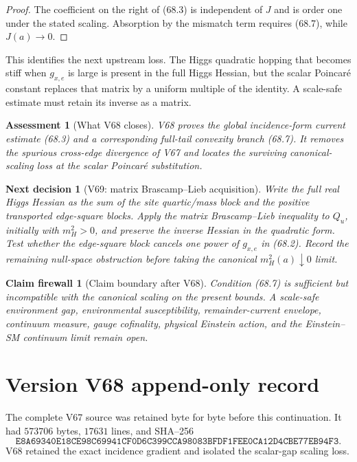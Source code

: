 \documentclass[11pt]{article}
\newtheorem{firewall}[theorem]{Claim firewall}
\newtheorem{decision}[theorem]{Next decision}
\newtheorem{assessment}[theorem]{Assessment}
\theoremstyle{remark}
\begin{document}
\begin{proof}
The coefficient on the right of (68.3) is independent of \(J\) and is
order one under the stated scaling.  Absorption by the mismatch term
requires (68.7), while \(J(a)\to0\).
\end{proof}

This identifies the next upstream loss.  The Higgs quadratic hopping
that becomes stiff when \(g_{x,e}\) is large is present in the full
Higgs Hessian, but the scalar Poincar\'e constant replaces that matrix
by a uniform multiple of the identity.  A scale-safe estimate must
retain its inverse as a matrix.

\begin{assessment}[What V68 closes]
\label{ass:v17v68-status}
V68 proves the global incidence-form current estimate (68.3) and a
corresponding full-tail convexity branch (68.7).  It removes the
spurious cross-edge divergence of V67 and locates the surviving
canonical-scaling loss at the scalar Poincar\'e substitution.
\end{assessment}

\begin{decision}[V69: matrix Brascamp--Lieb acquisition]
\label{dec:v17v68-next}
Write the full real Higgs Hessian as the sum of the site quartic/mass
block and the positive transported edge-square blocks.  Apply the
matrix Brascamp--Lieb inequality to \(Q_u\), initially with
\(m_H^2>0\), and preserve the inverse Hessian in the quadratic form.
Test whether the edge-square block cancels one power of
\(g_{x,e}\) in (68.2).  Record the remaining null-space obstruction
before taking the canonical \(m_H^2(a)\downarrow0\) limit.
\end{decision}

\begin{firewall}[Claim boundary after V68]
\label{fire:v17v68}
Condition (68.7) is sufficient but incompatible with the canonical
scaling on the present bounds.  A scale-safe environment gap,
environmental susceptibility, remainder-current envelope, continuum
measure, gauge cofinality, physical Einstein action, and the
Einstein--SM continuum limit remain open.
\end{firewall}

\section*{Version V68 append-only record}
The complete V67 source was retained byte for byte before this
continuation.  It had \(573706\) bytes, \(17631\) lines, and SHA--256
\[
 \texttt{E8A69340E18CE98C69941CF0D6C399CCA98083BFDF1FEE0CA12D4CBE77EB94F3}.
\]
V68 retained the exact incidence gradient and isolated the scalar-gap
scaling loss.
\end{document}
